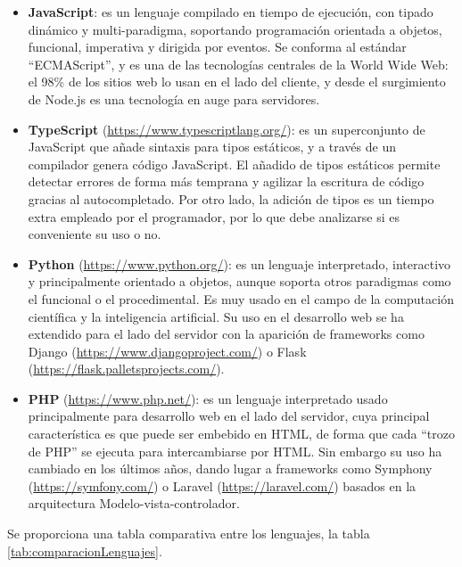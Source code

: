 \begin{itemize}
    \item \textbf{JavaScript}: es un lenguaje compilado en tiempo de ejecución, con tipado dinámico y multi-paradigma, soportando programación orientada a objetos, funcional, imperativa y dirigida por eventos\cite{wiki:JavaScript}. Se conforma al estándar ``ECMAScript'', y es una de las tecnologías centrales de la World Wide Web: el 98\% de los sitios web lo usan en el lado del cliente\cite{javascriptUsage}, y desde el surgimiento de Node.js es una tecnología en auge para servidores.
    \item \textbf{TypeScript} (\url{https://www.typescriptlang.org/}): es un superconjunto de JavaScript que añade sintaxis para tipos estáticos, y a través de un compilador genera código JavaScript\cite{typescriptWeb}. El añadido de tipos estáticos permite detectar errores de forma más temprana y agilizar la escritura de código gracias al autocompletado. Por otro lado, la adición de tipos es un tiempo extra empleado por el programador, por lo que debe analizarse si es conveniente su uso o no.
    \item \textbf{Python} (\url{https://www.python.org/}): es un lenguaje interpretado, interactivo y principalmente orientado a objetos, aunque soporta otros paradigmas como el funcional o el procedimental\cite{pythonFAQGeneral}. Es muy usado en el campo de la computación científica y la inteligencia artificial. Su uso en el desarrollo web se ha extendido para el lado del servidor con la aparición de frameworks como Django (\url{https://www.djangoproject.com/}) o Flask (\url{https://flask.palletsprojects.com/}).
    \item \textbf{PHP} (\url{https://www.php.net/}): es un lenguaje interpretado usado principalmente para desarrollo web en el lado del servidor, cuya principal característica es que puede ser embebido en HTML, de forma que cada ``trozo de PHP'' se ejecuta para intercambiarse por HTML. Sin embargo su uso ha cambiado en los últimos años, dando lugar a frameworks como Symphony (\url{https://symfony.com/}) o Laravel (\url{https://laravel.com/}) basados en la arquitectura Modelo-vista-controlador.
\end{itemize}

Se proporciona una tabla comparativa entre los lenguajes, la tabla \ref{tab:comparacionLenguajes}.

